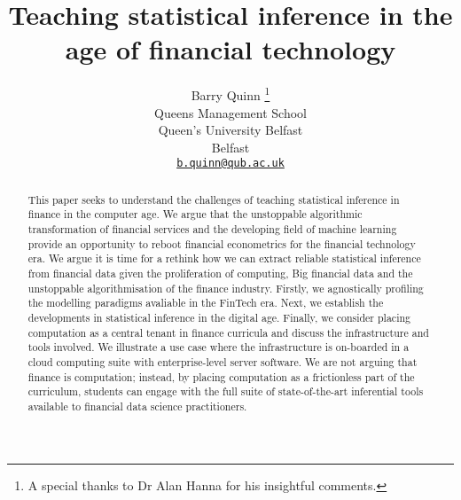 \documentclass{article}
\title{Teaching statistical inference in the age of financial technology}
\author{
    Barry Quinn
    \thanks{A special thanks to Dr Alan Hanna for his insightful comments.}
   \\
    Queens Management School \\
    Queen's University Belfast \\
  Belfast \\
  \texttt{\href{mailto:b.quinn@qub.ac.uk}{\nolinkurl{b.quinn@qub.ac.uk}}} \\
  }
\begin{document}
\maketitle

\def\tightlist{}


\begin{abstract}
This paper seeks to understand the challenges of teaching statistical
inference in finance in the computer age. We argue that the unstoppable
algorithmic transformation of financial services and the developing
field of machine learning provide an opportunity to reboot financial
econometrics for the financial technology era. We argue it is time for a
rethink how we can extract reliable statistical inference from financial
data given the proliferation of computing, Big financial data and the
unstoppable algorithmisation of the finance industry. Firstly, we
agnostically profiling the modelling paradigms avaliable in the FinTech
era. Next, we establish the developments in statistical inference in the
digital age. Finally, we consider placing computation as a central
tenant in finance curricula and discuss the infrastructure and tools
involved. We illustrate a use case where the infrastructure is
on-boarded in a cloud computing suite with enterprise-level server
software. We are not arguing that finance is computation; instead, by
placing computation as a frictionless part of the curriculum, students
can engage with the full suite of state-of-the-art inferential tools
available to financial data science practitioners.
\end{abstract}






\end{document}
